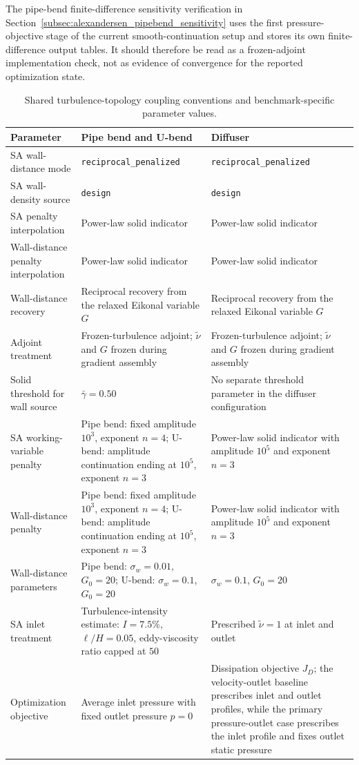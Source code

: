 The pipe-bend finite-difference sensitivity verification in Section~\ref{subsec:alexandersen_pipebend_sensitivity} uses the first pressure-objective stage of the current smooth-continuation setup and stores its own finite-difference output tables. It should therefore be read as a frozen-adjoint implementation check, not as evidence of convergence for the reported optimization state.

\begin{table}[htbp]
	\centering
	\footnotesize
	\caption{Shared turbulence-topology coupling conventions and benchmark-specific parameter values.}
	\label{tab:app_B_shared_coupling_conventions}
	\renewcommand{\arraystretch}{1.2}
	\begin{tabularx}{\textwidth}{l X X}
		\hline
		\textbf{Parameter} & \textbf{Pipe bend and U-bend} & \textbf{Diffuser} \\
		\hline
		SA wall-distance mode & \texttt{reciprocal\_penalized} & \texttt{reciprocal\_penalized} \\
		SA wall-density source & \texttt{design} & \texttt{design} \\
		SA penalty interpolation & Power-law solid indicator & Power-law solid indicator \\
		Wall-distance penalty interpolation & Power-law solid indicator & Power-law solid indicator \\
		Wall-distance recovery & Reciprocal recovery from the relaxed Eikonal variable $G$ & Reciprocal recovery from the relaxed Eikonal variable $G$ \\
		Adjoint treatment & Frozen-turbulence adjoint; $\tilde{\nu}$ and $G$ frozen during gradient assembly & Frozen-turbulence adjoint; $\tilde{\nu}$ and $G$ frozen during gradient assembly \\
		Solid threshold for wall source & $\bar{\gamma}=0.50$ & No separate threshold parameter in the diffuser configuration \\
			SA working-variable penalty & Pipe bend: fixed amplitude $10^3$, exponent $n=4$; U-bend: amplitude continuation ending at $10^5$, exponent $n=3$ & Power-law solid indicator with amplitude $10^5$ and exponent $n=3$ \\
			Wall-distance penalty & Pipe bend: fixed amplitude $10^3$, exponent $n=4$; U-bend: amplitude continuation ending at $10^5$, exponent $n=3$ & Power-law solid indicator with amplitude $10^5$ and exponent $n=3$ \\
			Wall-distance parameters & Pipe bend: $\sigma_w=0.01$, $G_0=20$; U-bend: $\sigma_w=0.1$, $G_0=20$ & $\sigma_w=0.1$, $G_0=20$ \\
		SA inlet treatment & Turbulence-intensity estimate: $I=7.5\%$, $\ell/H=0.05$, eddy-viscosity ratio capped at $50$ & Prescribed $\tilde{\nu}=1$ at inlet and outlet \\
		Optimization objective & Average inlet pressure with fixed outlet pressure $p=0$ & Dissipation objective $J_D$; the velocity-outlet baseline prescribes inlet and outlet profiles, while the primary pressure-outlet case prescribes the inlet profile and fixes outlet static pressure \\
		\hline
	\end{tabularx}
\end{table}

